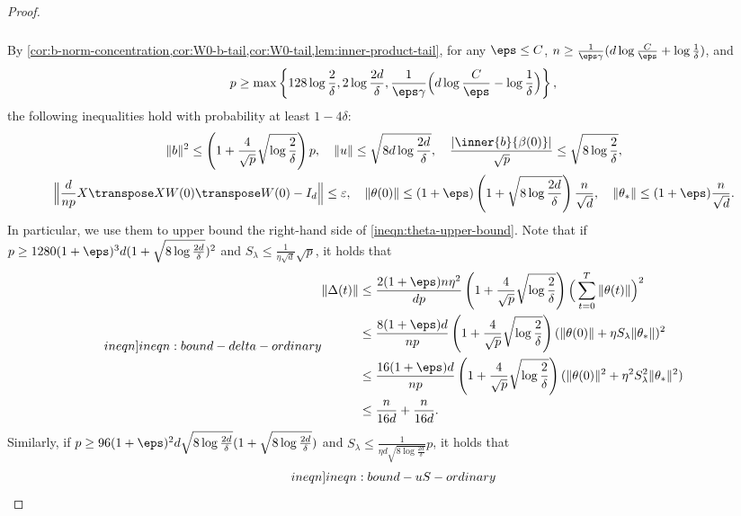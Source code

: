 \begin{proof}
\begin{align}
\begin{split}
    \end{split}
\end{align}
By \cref{cor:b-norm-concentration,cor:W0-b-tail,cor:W0-tail,lem:inner-product-tail}, for any $\eps \leq C$, $n \geq \frac{1}{\eps\gamma} (d\log\frac{C}{\eps} + \log\frac{1}{\delta})$, and
\begin{align*}
    p \geq \max\left\{128\log\frac{2}{\delta},2\log\frac{2d}{\delta},\frac{1}{\eps\gamma} \Big(d\log\frac{C}{\eps} - \log\frac{1}{\delta}\Big)\right\},
\end{align*}
the following inequalities hold with probability at least $1-4\delta$:
\begin{gather*}
    \|b\|^2 \leq \left(1 + \frac{4}{\sqrt p}\sqrt{\log\frac{2}{\delta}}\right) p, \quad \|u\| \leq \sqrt{8d\log\frac{2d}{\delta}}, \quad \frac{|\inner{b}{\beta(0)}|}{\sqrt{p}} \leq \sqrt{8\log\frac{2}{\delta}}, \\ 
    \Big\| \frac{d}{np}X\transpose XW(0)\transpose W(0) - I_d \Big\| \leq \varepsilon, \quad \|\theta(0)\|\leq (1+\eps)\left(1 + \sqrt{8\log\frac{2d}{\delta}}\right)\frac{n}{\sqrt{d}}, \quad \|\theta_*\|\leq (1+\eps)\frac{n}{\sqrt{d}}.
\end{gather*}
In particular, we use them to upper bound the right-hand side of \cref{ineqn:theta-upper-bound}. Note that if $p\geq 1280(1+\eps)^3d(1+\sqrt{8\log\frac{2d}{\delta}})^2$ and $S_\lambda\leq \frac{1}{\eta\sqrt{d}}\sqrt{p}$, it holds that
\begin{align}\label[ineqn]{ineqn:bound-delta-ordinary}
    \begin{split}
        \|\Delta(t)\| & \leq \frac{2(1+\eps)n\eta^2}{dp} \left(1 + \frac{4}{\sqrt p}\sqrt{\log\frac{2}{\delta}}\right) \Big(\sum_{t=0}^T\|\theta(t)\|\Big)^2 \\
        & \leq \frac{8(1+\eps)d}{np} \left(1 + \frac{4}{\sqrt p}\sqrt{\log\frac{2}{\delta}}\right) (\|\theta(0)\|+ \eta S_\lambda\|\theta_\ast\|)^2 \\
        & \leq  \frac{16(1+\eps)d}{np} \left(1 + \frac{4}{\sqrt p}\sqrt{\log\frac{2}{\delta}}\right) (\|\theta(0)\|^2 + \eta^2 S_\lambda^2\|\theta_\ast\|^2) \\
        & \leq \frac{n}{16d} + \frac{n}{16d}.
    \end{split}
\end{align}
Similarly, if $p\geq 96(1+\eps)^2 d\sqrt{8\log\frac{2d}{\delta}}(1 + \sqrt{8\log\frac{2d}{\delta}})$ and $S_\lambda\leq \frac{1}{\eta d\sqrt{8\log\frac{2d}{\delta}}}p$, it holds that
\begin{align}\label[ineqn]{ineqn:bound-uS-ordinary}

\end{align}
\end{proof}
